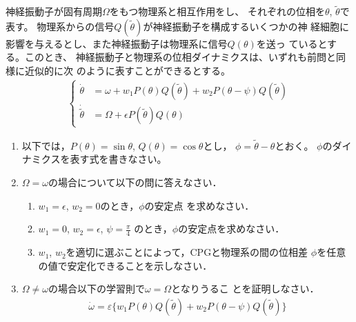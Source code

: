 \documentclass[twocolumn,11pt]{jarticle}
\begin{document}
\question
神経振動子が固有周期$\Omega$をもつ物理系と相互作用をし、
それぞれの位相を$\theta$, $\tilde{\theta}$で表す。
物理系からの信号$Q(\tilde{\theta})$が神経振動子を構成するいくつかの神
経細胞に影響を与えるとし、また神経振動子は物理系に信号$Q(\theta)$を送っ
ているとする。このとき、
神経振動子と物理系の位相ダイナミクスは、いずれも前問と同様に近似的に次
のように表すことができるとする。
\begin{align}
  \begin{cases}
  \dot{\theta}
  &=\omega+w_1P(\theta)Q(\tilde{\theta})+w_2P(\theta-\psi)Q(\tilde{\theta})\\
  \dot{\tilde{\theta}}&=\Omega+\epsilon P(\tilde{\theta})Q(\theta)
  \end{cases}
\end{align}
\begin{enumerate}
\item 以下では，$P(\theta)=\sin\theta$, $Q(\theta)=\cos\theta$とし，
  $\phi=\tilde{\theta}-\theta$とおく。
 $\phi$のダイナミクスを表す式を書きなさい。
  \item $\Omega=\omega$の場合について以下の問に答えなさい．
  \begin{enumerate}
  \item $w_1=\epsilon$, $w_2=0$のとき，$\phi$の安定点
    を求めなさい．
  \item $w_1=0$, $w_2=\epsilon$, $\psi=\frac{\pi}{4}$
    のとき，$\phi$の安定点を求めなさい．
  \item $w_1$, $w_2$を適切に選ぶことによって，CPGと物理系の間の位相差
    $\phi$を任意の値で安定化できることを示しなさい．
  \end{enumerate}
\item $\Omega\ne\omega$の場合以下の学習則で$\omega=\Omega$となりうるこ
  とを証明しなさい．
  \begin{align}
    \dot{\omega}=\varepsilon\{w_1P(\theta)Q(\tilde{\theta})+
  w_2P(\theta-\psi)Q(\tilde{\theta})\}
  \end{align}
\end{enumerate}

\newpage
\appendix
\end{document}
